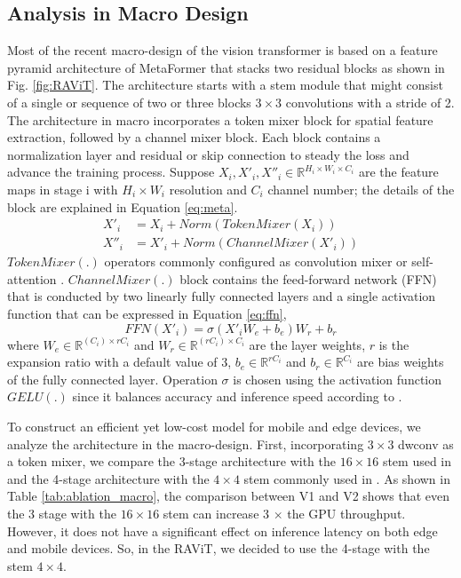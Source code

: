 \subsection{Analysis in Macro Design}
\label{subsec:abl-macro}
Most of the recent macro-design of the vision transformer is based on a feature pyramid architecture of MetaFormer \cite{yu2022metaformer, yu2023metaformer} that stacks two residual blocks as shown in Fig. \ref{fig:RAViT}. The architecture starts with a stem module that might consist of a single \cite{yu2022metaformer} or sequence of two \cite{maaz2022edgenext, li2022efficientformer, wang2024repvit} or three blocks \cite{yun2024shvit, liu2023efficientvit} $3 \times 3$ convolutions with a stride of 2. The architecture in macro incorporates a token mixer block for spatial feature extraction, followed by a channel mixer block. Each block contains a normalization layer and residual or skip connection to steady the loss and advance the training process. Suppose $X_i, X'_i, X''_i \in \mathbb{R}^{H_i\times W_i\times C_i}$ are the feature maps in stage i with $H_i \times W_i$ resolution and $C_i$ channel number; the details of the block are explained in Equation \ref{eq:meta}.
\begin{equation}
    \begin{split}
    X'_i &= X_i + Norm(TokenMixer(X_i)) \\
    X''_i &= X'_i + Norm(ChannelMixer(X'_i))
    \end{split}
\label{eq:meta}
\end{equation}
$TokenMixer(.)$ operators commonly configured as convolution mixer or self-attention \cite{yu2023metaformer}. $ChannelMixer(.)$ block contains the feed-forward network (FFN) that is conducted by two linearly fully connected layers and a single activation function that can be expressed in Equation \ref{eq:ffn},
\begin{equation}
    FFN(X'_i)=\sigma(X'_iW_e+b_e)W_r+b_r
    \label{eq:ffn}
\end{equation}
where $W_e\in\mathbb{R}^{(C_i)\times rC_i}$ and $W_r\in\mathbb{R}^{(rC_i)\times C_i}$ are the layer weights, $r$ is the expansion ratio with a default value of 3, $b_e\in\mathbb{R}^{rC_i}$ and $b_r\in\mathbb{R}^{C_i}$ are bias weights of the fully connected layer. Operation $\sigma$ is chosen using the activation function $GELU(.)$ since it balances accuracy and inference speed according to \cite{wang2024repvit}. 

To construct an efficient yet low-cost model for mobile and edge devices, we analyze the architecture in the macro-design. First, incorporating $3 \times 3$ dwconv as a token mixer, we compare the 3-stage architecture with the $16 \times 16$ stem used in \cite{graham2021levit, liu2023efficientvit, yun2024shvit} and the 4-stage architecture with the $4 \times 4$ stem commonly used in \cite{vasu2023fastvit, li2022efficientformer, maaz2022edgenext}. As shown in Table \ref{tab:ablation_macro}, the comparison between V1 and V2 shows that even the 3 stage with the $16 \times 16$ stem can increase 3 $\times$ the GPU throughput. However, it does not have a significant effect on inference latency on both edge and mobile devices.  So, in the RAViT, we decided to use the 4-stage with the stem $4 \times 4$.
